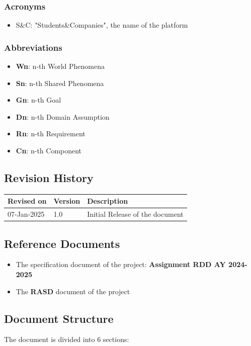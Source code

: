 \documentclass[a4paper,12pt]{article}
\begin{document}
\subsubsection{Acronyms}
    \begin{itemize}
        \item S\&C: "Students\&Companies", the name of the platform
    \end{itemize}
\subsubsection{Abbreviations}
    \begin{itemize}
        \item \textbf{Wn}: n-th World Phenomena
        \item \textbf{Sn}: n-th Shared Phenomena
        \item \textbf{Gn}: n-th Goal
        \item \textbf{Dn}: n-th Domain Assumption
        \item \textbf{Rn}: n-th Requirement
        \item \textbf{Cn}: n-th Component
    \end{itemize}
\subsection{Revision History}
\noindent
\begin{tabularx}{\textwidth}{llX}
    \toprule
    Revised on & Version & Description \\
    \midrule
    07-Jan-2025 & 1.0 & Initial Release of the document \\
    \bottomrule
\end{tabularx}
\subsection{Reference Documents}
    \begin{itemize}
        \item The specification document of the project: \textbf{Assignment RDD AY 2024-2025}
        \item The \textbf{RASD} document of the project

    \end{itemize}
\subsection{Document Structure}
The document is divided into 6 sections:
\end{document}
